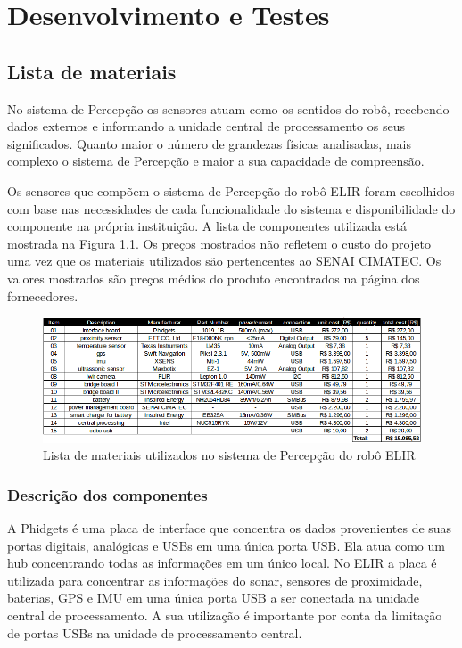 \chapter{Desenvolvimento e Testes}
\label{chap:result}




\section{Lista de materiais}
No sistema de Percepção os sensores atuam como os sentidos do robô, recebendo dados externos e informando a unidade central de processamento os seus significados. Quanto maior o número de grandezas físicas analisadas, mais complexo o sistema de Percepção e maior a sua capacidade de compreensão.

Os sensores que compõem o sistema de Percepção do robô ELIR foram escolhidos com base nas necessidades de cada funcionalidade do sistema e disponibilidade do componente na própria instituição. A lista de componentes utilizada está mostrada na Figura \ref{fig:list_mat}. Os preços mostrados não refletem o custo do projeto uma vez que os materiais utilizados são pertencentes ao SENAI CIMATEC. Os valores mostrados são preços médios do produto encontrados na página dos fornecedores.

\begin{figure}[h]
    \centering
    \includegraphics[width=16cm]{Figures/lista_materiais.png}
    \caption{Lista de materiais utilizados no sistema de Percepção do robô ELIR}
    \label{fig:list_mat}
\end{figure}

\subsection{Descrição dos componentes}

A Phidgets é uma placa de interface que concentra os dados provenientes de suas portas digitais, analógicas e USBs em uma única porta USB. Ela atua como um hub concentrando todas as informações em um único local. No ELIR a placa é utilizada para concentrar as informações do sonar, sensores de proximidade,  baterias, GPS e IMU em uma única porta USB a ser conectada na unidade central de processamento. A sua utilização é importante por conta da limitação de portas USBs na unidade de processamento central.

